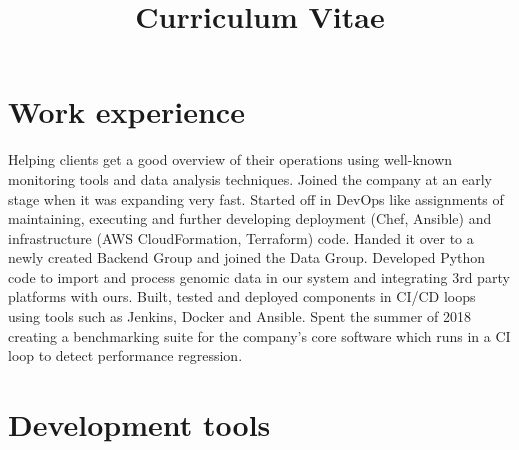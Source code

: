 \documentclass[11pt,a4paper,sans]{moderncv}
\title{Curriculum Vitae}
\begin{document}
\makecvtitle

\section{Work experience}
{Helping clients get a good overview of their operations using well-known
monitoring tools and data analysis techniques.}
{Joined the company at an early stage when it was expanding very fast.
Started off in DevOps like assignments of maintaining, executing and
further developing deployment (Chef, Ansible) and infrastructure (AWS
CloudFormation, Terraform) code. Handed it over to a newly created Backend
Group and joined the Data Group. Developed Python code to import and process
genomic data in our system and integrating 3rd party platforms with ours.
Built, tested and deployed components in CI/CD loops using tools such as
Jenkins, Docker and Ansible. Spent the summer of 2018 creating a benchmarking suite
for the company's core software which runs in a CI loop to detect performance
regression.}

\section{Development tools}
\end{document}
